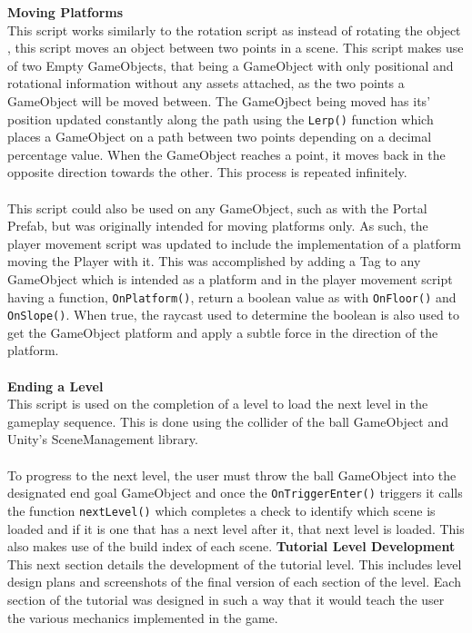 \noindent \textbf{Moving Platforms}\\
This script works similarly to the rotation script as instead of rotating the object , this script moves an object between two points in a scene. This script makes use of two Empty GameObjects, that being a GameObject with only positional and rotational information without any assets attached, as the two points a GameObject will be moved between. The GameOjbect being moved has its' position updated constantly along the path using the \texttt{Lerp()} function which places a GameObject on a path between two points depending on a decimal percentage value. When the GameObject reaches a point, it moves back in the opposite direction  towards the other. This process is repeated infinitely.
\\\\
This script could also be used on any GameObject, such as with the Portal Prefab, but was originally intended for moving platforms only. As such, the player movement script was updated to include the implementation of a platform moving the Player with it. This was accomplished by adding a Tag to any GameObject which is intended as a platform and in the player movement script having a function, \texttt{OnPlatform()}, return a boolean value as with \texttt{OnFloor()} and \texttt{OnSlope()}. When true, the raycast used to determine the boolean is also used to get the GameObject platform and apply a subtle force in the direction of the platform.
\\\\
\textbf{Ending a Level}\\
This script is used on the completion of a level to load the next level in the gameplay sequence. This is done using the collider of the ball GameObject and Unity's SceneManagement library.
\\\\
To progress to the next level, the user must throw the ball GameObject into the designated end goal GameObject and once the \texttt{OnTriggerEnter()} triggers it calls the function \texttt{nextLevel()} which completes a check to identify which scene is loaded and if it is one that has a next level after it, that next level is loaded. This also makes use of the build index of each scene.
\newpage
\noindent \textbf{Tutorial Level Development}\\
This next section details the development of the tutorial level. This includes level design plans and screenshots of the final version of each section of the level. Each section of the tutorial was designed in such a way that it would teach the user the various mechanics implemented in the game.
